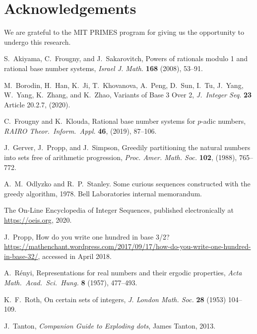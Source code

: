 \documentclass[12pt,reqno]{article}
\theoremstyle{plain}
\theoremstyle{definition}
\theoremstyle{remark}
\begin{document}
\section{Acknowledgements}

We are grateful to the MIT PRIMES program for giving us the opportunity to undergo this research.

\begin{thebibliography}{99}
 S.~Akiyama, C.~Frougny, and J.~Sakarovitch, Powers of rationals modulo 1 and rational base number systems, {\it Israel J. Math.} \textbf{168} (2008), 53--91.

M.~Borodin, H.~Han, K.~Ji, T.~Khovanova, A.~Peng, D.~Sun, I.~Tu, J.~Yang, W.~Yang, K.~Zhang, and K.~Zhao, Variants of Base 3 Over 2, 
{\it  J.~Integer Seq.} \textbf{23} Article 20.2.7, (2020).

 C.~Frougny and K.~Klouda, Rational base number systems for $p$-adic numbers, \textit{RAIRO Theor.~Inform.~Appl.} \textbf{46}, (2019), 87--106.

 J.~Gerver, J.~Propp, and J.~Simpson, Greedily partitioning the natural numbers into sets free of arithmetic progression, {\it Proc. Amer. Math. Soc.} \textbf{102}, (1988), 765--772.

 A.~M.~Odlyzko and R.~P.~Stanley. Some curious sequences constructed with the greedy algorithm,
1978. Bell Laboratories internal memorandum.

 The On-Line Encyclopedia of Integer Sequences, published electronically at \url{https://oeis.org}, 2020.

 J.~Propp, How do you write one hundred in base 3/2? \url{https://mathenchant.wordpress.com/2017/09/17/how-do-you-write-one-hundred-in-base-32/}, accessed in April 2018.

 A.~R\'{e}nyi, Representations for real numbers and their ergodic properties, \textit{Acta Math.~Acad.~Sci.~Hung.} \textbf{8} (1957), 477--493.

 K.~F.~Roth, On certain sets of integers, \textit{J. London Math. Soc.} \textbf{28} (1953) 104--109. 

 J.~Tanton, {\it Companion Guide to Exploding dots}, James Tanton, 2013.

\end{thebibliography}
\end{document}
